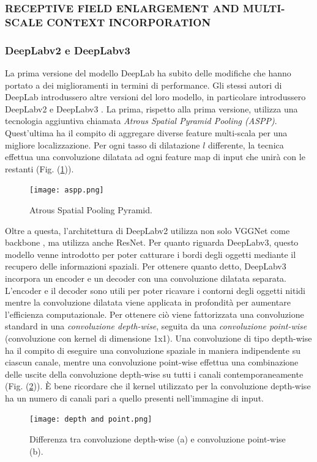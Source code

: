 \subsubsection{RECEPTIVE FIELD ENLARGEMENT AND MULTI-SCALE CONTEXT INCORPORATION}
\subsubsection{DeepLabv2 e DeepLabv3}
La prima versione del modello DeepLab ha subito delle modifiche che hanno 
portato a dei miglioramenti in termini di performance. Gli stessi autori di 
DeepLab introdussero altre versioni del loro modello, in particolare introdussero 
DeepLabv2 \cite{deeplabv2} e DeepLabv3 \cite{deeplabv3}. La prima, rispetto alla prima versione, utilizza 
una tecnologia aggiuntiva chiamata \emph{Atrous Spatial Pyramid Pooling (ASPP)}.  
Quest'ultima ha il compito di aggregare diverse feature multi-scala per una 
migliore localizzazione. Per ogni tasso di dilatazione $l$ differente, la tecnica 
effettua una convoluzione dilatata ad ogni feature map di input che unirà con le 
restanti (Fig. (\ref{aspp})).
\begin{figure}
    \centering
    \texttt{[image: aspp.png]}
    \centering
    \caption{Atrous Spatial Pooling Pyramid.}
    \label{aspp}
\end{figure}
Oltre a questa, l'architettura di DeepLabv2 utilizza non solo VGGNet come 
backbone , ma utilizza anche ResNet. Per quanto riguarda DeepLabv3, questo 
modello venne introdotto per poter catturare i bordi degli oggetti mediante il 
recupero delle informazioni spaziali. Per ottenere quanto detto, DeepLabv3 incorpora 
un encoder e un decoder con una convoluzione dilatata separata. L'encoder 
e il decoder sono utili per poter ricavare i contorni degli oggetti nitidi mentre 
la convoluzione dilatata viene applicata in profondità per aumentare l'efficienza 
computazionale. Per ottenere ciò viene fattorizzata una convoluzione standard in 
una \emph{convoluzione depth-wise}, seguita da una \emph{convoluzione point-wise} (convoluzione 
con kernel di dimensione 1x1). Una convoluzione di tipo depth-wise ha il compito 
di eseguire una convoluzione spaziale in maniera indipendente su ciascun canale, 
mentre una convoluzione point-wise effettua una combinazione delle uscite della 
convoluzione depth-wise su tutti i canali contemporaneamente (Fig. (\ref{depth and point})). È bene ricordare 
che il kernel utilizzato per la convoluzione depth-wise ha un numero di canali pari 
a quello presenti nell'immagine di input.
\begin{figure}
    \centering
    \texttt{[image: depth and point.png]}
    \centering
    \caption{Differenza tra convoluzione depth-wise (a) e convoluzione point-wise (b).}
    \label{depth and point}
\end{figure}

